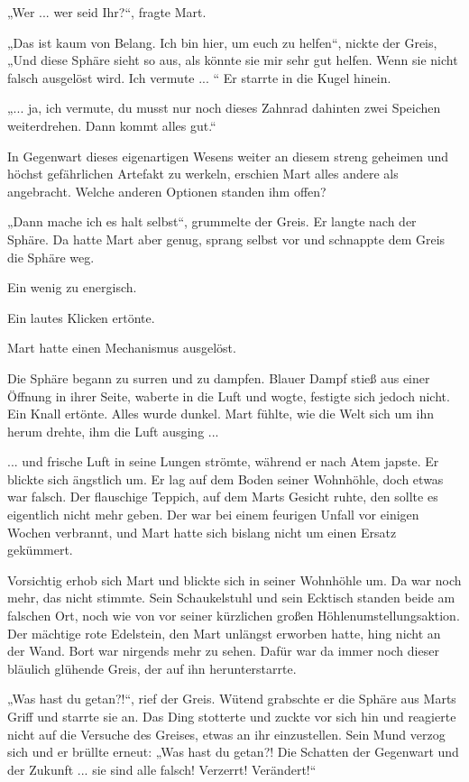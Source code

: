 „Wer ... wer seid Ihr?“, fragte Mart.

„Das ist kaum von Belang. Ich bin hier, um euch zu helfen“, nickte der Greis, „Und diese Sphäre sieht so aus, als könnte sie mir sehr gut helfen. Wenn sie nicht falsch ausgelöst wird. Ich vermute ...
“
Er starrte in die Kugel hinein.

„... ja, ich vermute, du musst nur noch dieses Zahnrad dahinten zwei Speichen weiterdrehen. Dann kommt alles gut.“ 

In Gegenwart dieses eigenartigen Wesens weiter an diesem streng geheimen und höchst gefährlichen Artefakt zu werkeln, erschien Mart alles andere als angebracht. Welche anderen Optionen standen ihm offen? 

„Dann mache ich es halt selbst“, grummelte der Greis. Er langte nach der Sphäre. Da hatte Mart aber genug, sprang selbst vor und schnappte dem Greis die Sphäre weg.


Ein wenig zu energisch. 

Ein lautes Klicken ertönte.

Mart hatte einen Mechanismus ausgelöst.

Die Sphäre begann zu surren und zu dampfen. Blauer Dampf stieß aus einer Öffnung in ihrer Seite, waberte in die Luft und wogte, festigte sich jedoch nicht. Ein Knall ertönte. Alles wurde dunkel. Mart fühlte, wie die Welt sich um ihn herum drehte, ihm die Luft ausging ...


... und frische Luft in seine Lungen strömte, während er nach Atem japste. Er blickte sich ängstlich um. Er lag auf dem Boden seiner Wohnhöhle, doch etwas war falsch. Der flauschige Teppich, auf dem Marts Gesicht ruhte, den sollte es eigentlich nicht mehr geben. Der war bei einem feurigen Unfall vor einigen Wochen verbrannt, und Mart hatte sich bislang nicht um einen Ersatz gekümmert. 

Vorsichtig erhob sich Mart und blickte sich in seiner Wohnhöhle um. Da war noch mehr, das nicht stimmte. Sein Schaukelstuhl und sein Ecktisch standen beide am falschen Ort, noch wie von vor seiner kürzlichen großen Höhlenumstellungsaktion. Der mächtige rote Edelstein, den Mart unlängst erworben hatte, hing nicht an der Wand. Bort war nirgends mehr zu sehen. Dafür war da immer noch dieser bläulich glühende Greis, der auf ihn herunterstarrte.

„Was hast du getan?!“, rief der Greis. Wütend grabschte er die Sphäre aus Marts Griff und starrte sie an. Das Ding stotterte und zuckte vor sich hin und reagierte nicht auf die Versuche des Greises, etwas an ihr einzustellen. Sein Mund verzog sich und er brüllte erneut: „Was hast du getan?! Die Schatten der Gegenwart und der Zukunft ... sie sind alle falsch! Verzerrt! Verändert!“

